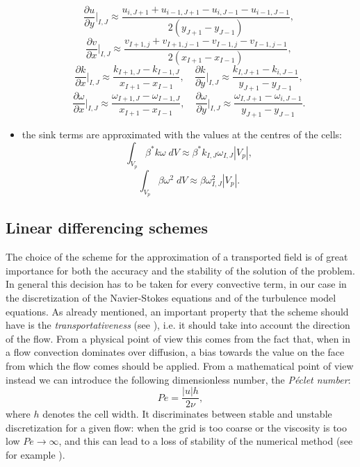 \begin{itemize}
	\begin{equation}
	\frac{\partial u}{\partial y}\Big|_{I,J} \approx 
	\frac{u_{i,J+1}+u_{i-1,J+1}-u_{i,J-1}-u_{i-1,J-1}}{2(y_{J+1}-y_{J-1})},
	\end{equation}
	\begin{equation}
	\frac{\partial v}{\partial x} \Big|_{I,J} \approx 
	\frac{v_{I+1,j}+v_{I+1,j-1}-v_{I-1,j}-v_{I-1,j-1}}{2(x_{I+1}-x_{I-1})},
	\end{equation}
	\begin{equation}
	\frac{\partial k}{\partial x}\Big|_{I,J} \approx \frac{k_{I+1,J} - 
		k_{I-1,J}}{x_{I+1} - x_{I-1}}, 
	\quad \frac{\partial k}{\partial y}\Big|_{I,J} \approx 
	\frac{k_{I,J+1}-k_{i,J-1}}{y_{J+1}-y_{J-1}},
	\end{equation}
	\begin{equation}
	\frac{\partial \omega}{\partial x}\Big|_{I,J} \approx 
	\frac{\omega_{I+1,J} - \omega_{I-1,J}}{x_{I+1} - x_{I-1}}, \quad 
	\frac{\partial \omega}{\partial y}\Big|_{I,J} \approx 
	\frac{\omega_{I,J+1}-\omega_{i,J-1}}{y_{J+1}-y_{J-1}}.
	\end{equation}
	\item the sink terms are approximated with the values at the centres of the 
	cells:
	\begin{equation}
	\int_{V_p} \beta^* k \omega \; dV \approx 
	\beta^* k_{I,J}\omega_{I,J}|V_p|,
	\end{equation}
	\begin{equation}
	\int_{V_p} \beta \omega^2 \; dV \approx \beta \omega_{I,J}^2 |V_p|.
	\end{equation}
\end{itemize}
%
\subsection{Linear differencing schemes} \label{subsec:diffscheme}
The choice of the scheme for the approximation of a transported field is of 
great importance for both the accuracy and the stability of the solution of the 
problem. In general this decision has to be taken for every convective term, in our case in the discretization of the Navier-Stokes equations
and of the turbulence model equations. As already mentioned, an 
important property that the scheme should have is the \emph{transportativeness} 
(see \cite{main:vermal}), i.e. it should take into account the direction of the 
flow. From a physical point of view this comes from the fact that, when
in a flow convection dominates over diffusion,
a bias towards the value on the face from which the flow comes should be applied.
From a mathematical 
point of view instead we can introduce the following dimensionless number, the \emph{Péclet number}:
\begin{equation}
	Pe = \frac{|u| h}{2\nu},
\end{equation}
where $h$ denotes the cell width. It discriminates between stable and unstable discretization for a given flow: when the grid is too coarse or the viscosity 
is too low $Pe\rightarrow\infty$, and this can lead to a loss of stability of 
the numerical method (see for example \cite{main:quarteroni}).

